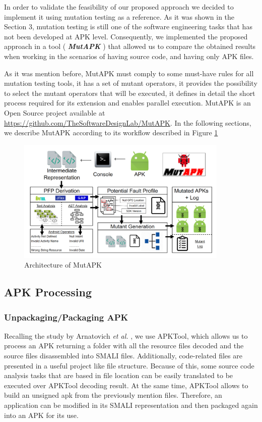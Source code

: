 In order to validate the feasibility of our proposed approach we decided to implement it using mutation testing as a reference. As it was shown in the Section 3, mutation testing is still one of the software engineering tasks that has not been developed at APK level. Consequently, we implemented the proposed approach in a tool ( \textit{\textbf{MutAPK}} ) that allowed us to compare the obtained results when working in the scenarios of having source code, and having only APK files.

As it was mention before, MutAPK must comply to some must-have rules for all mutation testing tools, it has a set of mutant operators, it provides the possibility to select the mutant operators that will be executed, it defines in detail the short process required for its extension and enables parallel execution. MutAPK is an Open Source project available at \url{https://github.com/TheSoftwareDesignLab/MutAPK}. In the following sections, we describe MutAPK according to its workflow described in Figure \ref{fig:mutapkArchitecture}

\begin{figure}[htbp]
	\centerline{\includegraphics[width=0.9\textwidth]{Figures/mutapkArchitecture.png}}
	\caption{Architecture of MutAPK}
	\label{fig:mutapkArchitecture}
\end{figure}

\subsection{APK Processing}
\subsubsection{Unpackaging/Packaging APK}

Recalling the study by Arnatovich \textit{et al.} \cite{arnatovich2018comparison}, we use APKTool, which allows us to process an APK returning a folder with all the resource files decoded and the source files disassembled into SMALI files. Additionally, code-related files are presented in a useful project like file structure. Because of this, some source code analysis tasks that are based in file location can be easily translated to be executed over APKTool decoding result. At the same time, APKTool allows to build an unsigned apk from the previously mention files. Therefore, an application can be modified in its SMALI representation and then packaged again into an APK for its use.

